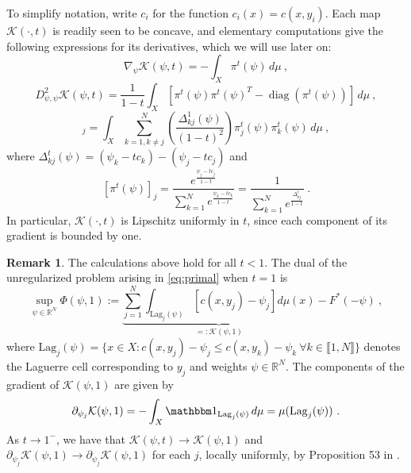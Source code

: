 \documentclass{scrartcl}
\newcommand{\R}{{\mathbb R}}
\newcommand{\diag}{\operatorname{diag}}
\theoremstyle{plain}
\theoremstyle{definition}
\newtheorem{rem}[thm]{Remark}
\begin{document}
To simplify notation, write $c_i$ for the function $c_i(x)=c(x,y_i)$. Each map $\mathcal{K}(\cdot,t)$ is readily seen to be concave, and elementary computations give the following expressions for its derivatives, which we will use later on:
\begin{equation}\label{eqn: regulairzed grad wrt phi}
    \nabla_\psi\mathcal{K}(\psi,t) = - \int_X \pi^t(\psi)\,d\mu\ ,
\end{equation}
\begin{equation}
    D^2_{\psi,\psi}\mathcal{K}(\psi,t) = \frac{1}{1-t}\int_X [\pi^t(\psi)\pi^t(\psi)^T - \diag(\pi^t(\psi))]\,d\mu\ ,
\end{equation}
\begin{equation}
    [\partial_t\nabla_\psi\mathcal{K}(\psi,t)]_j = \int_X \sum_{k=1,k\neq j}^N \left(\frac{\Delta_{kj}^1(\psi)}{(1-t)^2} \right) \pi_j^t(\psi) \pi_k^t(\psi) \,d\mu\ ,
\end{equation}
where $\Delta^t_{kj}(\psi)= (\psi_k-tc_k)-(\psi_j-tc_j)$ and
\begin{equation}\label{eqn: regularized laguerre integrand}
    [\pi^t(\psi)]_j = \frac{e^{ \frac{\psi_j-tc_j}{1-t}}}{ \sum_{k=1}^N e^{ \frac{\psi_k-tc_k}{1-t}}} = \frac{1}{\sum_{k=1}^N e^{\frac{\Delta_{kj}^t}{1-t}}}\ .
\end{equation}
In particular, $\mathcal{K}(\cdot,t)$ is Lipschitz uniformly in $t$, since each component of its gradient is bounded by one.

\begin{rem}
The calculations above hold for all $t<1$.  The dual of the unregularized problem arising in \eqref{eq:primal} when $t=1$ is
\begin{equation} \label{eq:dual unregularized}
    \sup_{\psi\in\R^N} \Phi(\psi,1):=\underbrace{\sum_{j=1}^N\int_{ \mathrm{Lag}_j(\psi)}[c(x,y_j) -\psi_j]d\mu(x)}_{=:\mathcal{K}(\psi,1)} -F^*\left(-\psi\right)\ ,
\end{equation}
where $\mathrm{Lag}_j(\psi)=\{x\in X : c(x,y_j)-\psi_j \leq c(x,y_k)-\psi_k\ \forall k\in \llbracket 1,N\rrbracket\}$ denotes the Laguerre cell corresponding to $y_j$
 and weights $\psi\in\R^N$.
The components of the gradient of $\mathcal{K}(\psi,1)$ are given by
\begin{equation*}
    \partial_{\psi_j}\mathcal{K}(\psi,1)= -\int_X \mathbbm 1_{\mathrm{Lag}_j(\psi)} \,d\mu = \mu(\mathrm{Lag}_j(\psi))\ .
\end{equation*}
As $t \rightarrow 1^-$, we have that   $\mathcal{K}(\psi,t)\rightarrow \mathcal{K}(\psi,1)$ and $\partial_{\psi_j}\mathcal{K}(\psi,1) \rightarrow    \partial_{\psi_j}\mathcal{K}(\psi,1)$ for each $j$, locally uniformly, by Proposition 53 in \cite{MerigotThibert2021}.
\end{rem}
\end{document}
